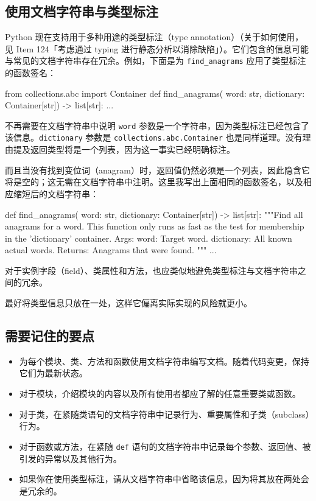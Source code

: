 \subsection{使用文档字符串与类型标注}

Python 现在支持用于多种用途的类型标注（type annotation）（关于如何使用，见 Item 124「考虑通过 typing 进行静态分析以消除缺陷」）。它们包含的信息可能与常见的文档字符串存在冗余。例如，下面是为 \texttt{find\_anagrams} 应用了类型标注的函数签名：

\begin{codebox}[python]
from collections.abc import Container
def find_anagrams( word: str,
dictionary: Container[str]) -> list[str]:
    ...
\end{codebox}

不再需要在文档字符串中说明 \texttt{word} 参数是一个字符串，因为类型标注已经包含了该信息。\texttt{dictionary} 参数是 \texttt{collections.abc.Container} 也是同样道理。没有理由提及返回类型将是一个列表，因为这一事实已经明确标注。

而且当没有找到变位词（anagram）时，返回值仍然必须是一个列表，因此隐含它将是空的；这无需在文档字符串中注明。这里我写出上面相同的函数签名，以及相应缩短后的文档字符串：

\begin{codebox}[python]
def find_anagrams( word: str,
dictionary: Container[str]) -> list[str]:
    """Find all anagrams for a word.
    This function only runs as fast as the test for
    membership in the 'dictionary' container.
    Args:
        word: Target word.
        dictionary: All known actual words.
    Returns:
        Anagrams that were found.
    """
    ...
\end{codebox}

对于实例字段（field）、类属性和方法，也应类似地避免类型标注与文档字符串之间的冗余。

最好将类型信息只放在一处，这样它偏离实际实现的风险就更小。

\subsection{需要记住的要点}

\begin{itemize}
\item 为每个模块、类、方法和函数使用文档字符串编写文档。随着代码变更，保持它们为最新状态。
\item 对于模块，介绍模块的内容以及所有使用者都应了解的任意重要类或函数。
\item 对于类，在紧随类语句的文档字符串中记录行为、重要属性和子类（subclass）行为。
\item 对于函数或方法，在紧随 \texttt{def} 语句的文档字符串中记录每个参数、返回值、被引发的异常以及其他行为。
\item 如果你在使用类型标注，请从文档字符串中省略该信息，因为将其放在两处会是冗余的。
\end{itemize}

